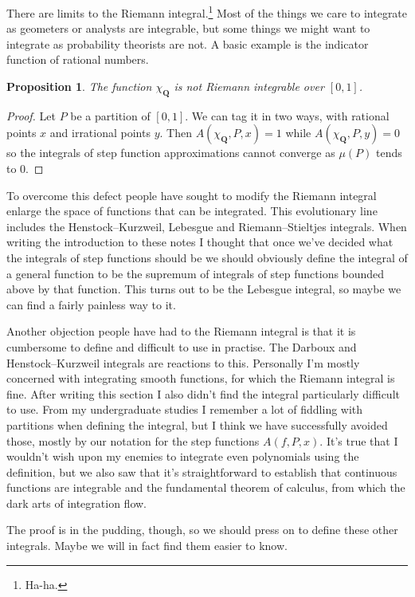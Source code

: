 \documentclass[11pt]{amsart}
\newtheorem{prop}[theo]{Proposition}
\theoremstyle{definition}
\def\QQ{\mathbf{Q}}
\begin{document}
There are limits to the Riemann integral.\footnote{Ha-ha.}
Most of the things we care to integrate as geometers or analysts are integrable, but some things we might want to integrate as probability theorists are not.
A basic example is the indicator function of rational numbers.

\begin{prop}
The function $\chi_{\QQ}$ is not Riemann integrable over $[0,1]$.
\end{prop}

\begin{proof}
Let $P$ be a partition of $[0,1]$.
We can tag it in two ways, with rational points $x$ and irrational points $y$.
Then $A(\chi_{\QQ}, P, x) = 1$ while $A(\chi_{\QQ}, P, y) = 0$ so the integrals of step function approximations cannot converge as $\mu(P)$ tends to $0$.
\end{proof}

To overcome this defect people have sought to modify the Riemann integral enlarge the space of functions that can be integrated.
This evolutionary line includes the Henstock--Kurzweil, Lebesgue and Riemann--Stieltjes integrals.
When writing the introduction to these notes I thought that once we've decided what the integrals of step functions should be we should obviously define the integral of a general function to be the supremum of integrals of step functions bounded above by that function.
This turns out to be the Lebesgue integral, so maybe we can find a fairly painless way to it.

Another objection people have had to the Riemann integral is that it is cumbersome to define and difficult to use in practise.
The Darboux and Henstock--Kurzweil integrals are reactions to this.
Personally I'm mostly concerned with integrating smooth functions, for which the Riemann integral is fine.
After writing this section I also didn't find the integral particularly difficult to use.
From my undergraduate studies I remember a lot of fiddling with partitions when defining the integral, but I think we have successfully avoided those, mostly by our notation for the step functions $A(f,P,x)$.
It's true that I wouldn't wish upon my enemies to integrate even polynomials using the definition, but we also saw that it's straightforward to establish that continuous functions are integrable and the fundamental theorem of calculus, from which the dark arts of integration flow.

The proof is in the pudding, though, so we should press on to define these other integrals.
Maybe we will in fact find them easier to know.
\end{document}

